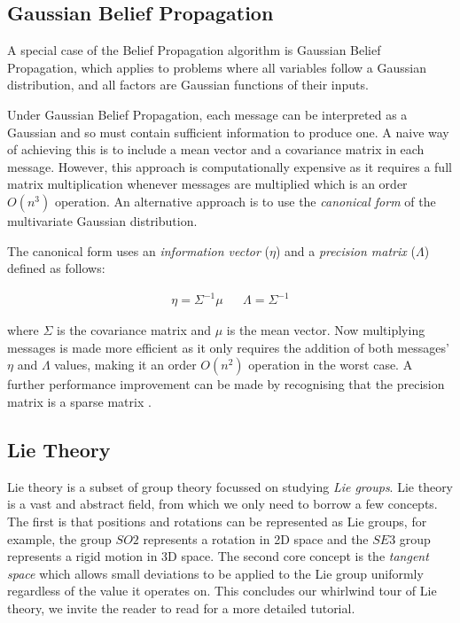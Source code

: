 \subsection{Gaussian Belief Propagation}
A special case of the Belief Propagation algorithm is Gaussian Belief Propagation, which applies to problems where all variables follow a Gaussian distribution, and all factors are Gaussian functions of their inputs.

Under Gaussian Belief Propagation, each message can be interpreted as a Gaussian and so must contain sufficient information to produce one. A naive way of achieving this is to include a mean vector and a covariance matrix in each message. However, this approach is computationally expensive as it requires a full matrix multiplication whenever messages are multiplied which is an order $O(n^3)$ operation. An alternative approach is to use the \textit{canonical form} of the multivariate Gaussian distribution.

The canonical form uses an \textit{information vector} ($\eta$) and a \textit{precision matrix} ($\Lambda$) defined as follows:

\begin{align*}
    \eta = \Sigma^{-1} \mu && \Lambda = \Sigma^{-1}
\end{align*}

where $\Sigma$ is the covariance matrix and $\mu$ is the mean vector. Now multiplying messages is made more efficient as it only requires the addition of both messages' $\eta$ and $\Lambda$ values, making it an order $O(n^2)$ operation in the worst case. A further performance improvement can be made by recognising that the precision matrix is a sparse matrix \cite{GaussianBP}.


\subsection{Lie Theory}
Lie theory is a subset of group theory focussed on studying \textit{Lie groups}. Lie theory is a vast and abstract field, from which we only need to borrow a few concepts. The first is that positions and rotations can be represented as Lie groups, for example, the group $SO2$ represents a rotation in 2D space and the $SE3$ group represents a rigid motion in 3D space. The second core concept is the \textit{tangent space} which allows small deviations to be applied to the Lie group uniformly regardless of the value it operates on. This concludes our whirlwind tour of Lie theory, we invite the reader to read \cite{MicroLieTheory} for a more detailed tutorial.

